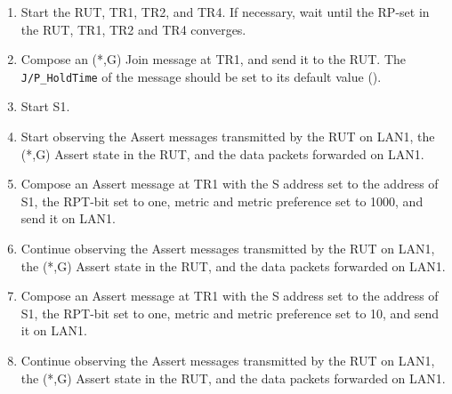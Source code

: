 \documentclass[11pt]{report}
\begin{document}
\begin{enumerate}

  \item Start the RUT, TR1, TR2, and TR4. If necessary, wait until the RP-set
  in the RUT, TR1, TR2 and TR4 converges.

  \item Compose an (*,G) Join message at TR1, and send it to the RUT.
  The \verb=J/P_HoldTime= of the message should be set to its default
  value ({\PimsmJPHoldTime}).

  \item Start S1.

  \item Start observing the Assert messages transmitted by the RUT on
  LAN1, the (*,G) Assert state in the RUT, and the data packets forwarded on
  LAN1. 

  \item Compose an Assert message at TR1 with the S address set to the
  address of S1, the RPT-bit set to one, metric and metric preference set to
  1000, and send it on LAN1.

  \item Continue observing the Assert messages transmitted by the RUT on
  LAN1, the (*,G) Assert state in the RUT, and the data packets forwarded on
  LAN1.

  \item Compose an Assert message at TR1 with the S address set to the
  address of S1, the RPT-bit set to one, metric and metric preference set to
  10, and send it on LAN1.

  \item Continue observing the Assert messages transmitted by the RUT on
  LAN1, the (*,G) Assert state in the RUT, and the data packets forwarded on
  LAN1.

\end{enumerate}

\end{document}
